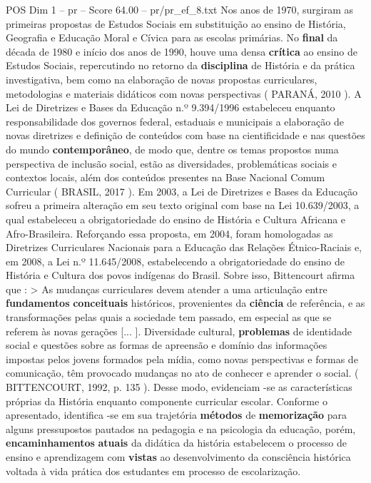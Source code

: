 \begin{textsample}{POS Dim 1 – pr – Score 64.00 – pr/pr\_ef\_8.txt}
Nos anos de 1970, surgiram as primeiras propostas de Estudos Sociais em substituição ao ensino de História, Geografia e Educação Moral e Cívica para as escolas primárias.
No \textbf{final} da década de 1980 e início dos anos de 1990, houve uma densa \textbf{crítica} ao ensino de Estudos Sociais, repercutindo no retorno da \textbf{disciplina} de História e da prática investigativa, bem como na elaboração de novas propostas curriculares, metodologias e materiais didáticos com novas perspectivas ( PARANÁ, 2010 ).
A Lei de Diretrizes e Bases da Educação n.º 9.394/1996 estabeleceu enquanto responsabilidade dos governos federal, estaduais e municipais a elaboração de novas diretrizes e definição de conteúdos com base na cientificidade e nas questões do mundo \textbf{contemporâneo}, de modo que, dentre os temas propostos numa perspectiva de inclusão social, estão as diversidades, problemáticas sociais e contextos locais, além dos conteúdos presentes na Base Nacional Comum Curricular ( BRASIL, 2017 ).
Em 2003, a Lei de Diretrizes e Bases da Educação sofreu a primeira alteração em seu texto original com base na Lei 10.639/2003, a qual estabeleceu a obrigatoriedade do ensino de História e Cultura Africana e Afro-Brasileira.
Reforçando essa proposta, em 2004, foram homologadas as Diretrizes Curriculares Nacionais para a Educação das Relações Étnico-Raciais e, em 2008, a Lei n.º 11.645/2008, estabelecendo a obrigatoriedade do ensino de História e Cultura dos povos indígenas do Brasil.
Sobre isso, Bittencourt afirma que : > As mudanças curriculares devem atender a uma articulação entre \textbf{fundamentos} \textbf{conceituais} históricos, provenientes da \textbf{ciência} de referência, e as transformações pelas quais a sociedade tem passado, em especial as que se referem às novas gerações [... ].
Diversidade cultural, \textbf{problemas} de identidade social e questões sobre as formas de apreensão e domínio das informações impostas pelos jovens formados pela mídia, como novas perspectivas e formas de comunicação, têm provocado mudanças no ato de conhecer e aprender o social. ( BITTENCOURT, 1992, p. 135 ).
Desse modo, evidenciam -se as características próprias da História enquanto componente curricular escolar.
Conforme o apresentado, identifica -se em sua trajetória \textbf{métodos} de \textbf{memorização} para alguns pressupostos pautados na pedagogia e na psicologia da educação, porém, \textbf{encaminhamentos} \textbf{atuais} da didática da história estabelecem o processo de ensino e aprendizagem com \textbf{vistas} ao desenvolvimento da consciência histórica voltada à vida prática dos estudantes em processo de escolarização.

\end{textsample}
